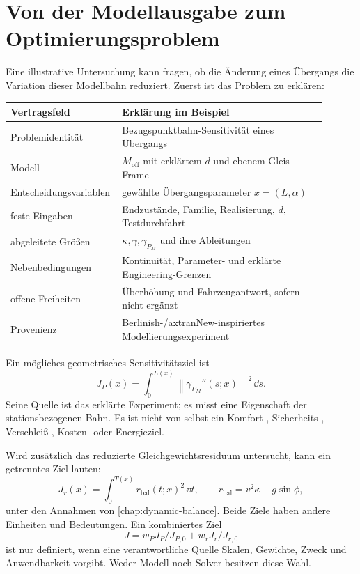 \section{Von der Modellausgabe zum Optimierungsproblem}

Eine illustrative Untersuchung kann fragen, ob die Änderung eines Übergangs
die Variation dieser Modellbahn reduziert. Zuerst ist das Problem zu erklären:

\begin{center}
\small
\begin{tabular}{p{0.27\linewidth}p{0.63\linewidth}}
\toprule
Vertragsfeld & Erklärung im Beispiel\\
\midrule
Problemidentität & Bezugspunktbahn-Sensitivität eines Übergangs\\
Modell & \(M_{\mathrm{off}}\) mit erklärtem \(d\) und ebenem Gleis-Frame\\
Entscheidungsvariablen & gewählte Übergangsparameter \(x=(L,\alpha)\)\\
feste Eingaben & Endzustände, Familie, Realisierung, \(d\), Testdurchfahrt\\
abgeleitete Größen & \(\kappa,\gamma,\gamma_{P_M}\) und ihre Ableitungen\\
Nebenbedingungen & Kontinuität, Parameter- und erklärte Engineering-Grenzen\\
offene Freiheiten & Überhöhung und Fahrzeugantwort, sofern nicht ergänzt\\
Provenienz & Berlinish-/axtranNew-inspiriertes Modellierungsexperiment\\
\bottomrule
\end{tabular}
\end{center}

Ein mögliches geometrisches Sensitivitätsziel ist
\[
J_P(x)=\int_0^{L(x)}
\left\|\gamma_{P_M}''(s;x)\right\|^2\,\dd s .
\]
Seine Quelle ist das erklärte Experiment; es misst eine Eigenschaft der
stationsbezogenen Bahn. Es ist nicht von selbst ein Komfort-, Sicherheits-,
Verschleiß-, Kosten- oder Energieziel.

Wird zusätzlich das reduzierte Gleichgewichtsresiduum untersucht, kann ein
getrenntes Ziel lauten:
\[
J_r(x)=\int_0^{T(x)}
r_{\mathrm{bal}}(t;x)^2\,\dd t,
\qquad
r_{\mathrm{bal}}=v^2\kappa-g\sin\phi,
\]
unter den Annahmen von \cref{chap:dynamic-balance}. Beide Ziele haben andere
Einheiten und Bedeutungen. Ein kombiniertes Ziel
\[
J=w_PJ_P/J_{P,0}+w_rJ_r/J_{r,0}
\]
ist nur definiert, wenn eine verantwortliche Quelle Skalen, Gewichte, Zweck
und Anwendbarkeit vorgibt. Weder Modell noch Solver besitzen diese Wahl.

